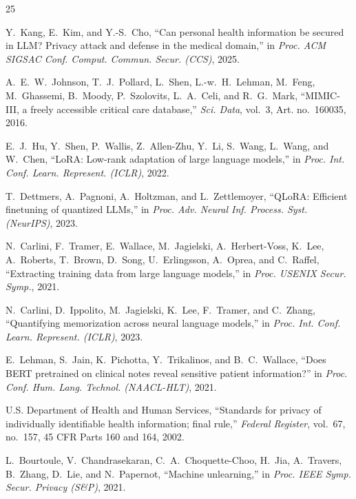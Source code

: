 \documentclass[lettersize,journal]{IEEEtran}
\begin{document}
\begin{thebibliography}{25}


Y.~Kang, E.~Kim, and Y.-S.~Cho, ``Can personal health information be secured in {LLM}? Privacy attack and defense in the medical domain,'' in \textit{Proc. ACM SIGSAC Conf. Comput. Commun. Secur. (CCS)}, 2025.

A.~E.~W.~Johnson, T.~J.~Pollard, L.~Shen, L.-w.~H.~Lehman, M.~Feng, M.~Ghassemi, B.~Moody, P.~Szolovits, L.~A.~Celi, and R.~G.~Mark, ``{MIMIC-III}, a freely accessible critical care database,'' \textit{Sci. Data}, vol.~3, Art. no.~160035, 2016.

E.~J.~Hu, Y.~Shen, P.~Wallis, Z.~Allen-Zhu, Y.~Li, S.~Wang, L.~Wang, and W.~Chen, ``{LoRA}: Low-rank adaptation of large language models,'' in \textit{Proc. Int. Conf. Learn. Represent. (ICLR)}, 2022.

T.~Dettmers, A.~Pagnoni, A.~Holtzman, and L.~Zettlemoyer, ``{QLoRA}: Efficient finetuning of quantized {LLMs},'' in \textit{Proc. Adv. Neural Inf. Process. Syst. (NeurIPS)}, 2023.

N.~Carlini, F.~Tramer, E.~Wallace, M.~Jagielski, A.~Herbert-Voss, K.~Lee, A.~Roberts, T.~Brown, D.~Song, U.~Erlingsson, A.~Oprea, and C.~Raffel, ``Extracting training data from large language models,'' in \textit{Proc. USENIX Secur. Symp.}, 2021.

N.~Carlini, D.~Ippolito, M.~Jagielski, K.~Lee, F.~Tramer, and C.~Zhang, ``Quantifying memorization across neural language models,'' in \textit{Proc. Int. Conf. Learn. Represent. (ICLR)}, 2023.

E.~Lehman, S.~Jain, K.~Pichotta, Y.~Trikalinos, and B.~C.~Wallace, ``Does {BERT} pretrained on clinical notes reveal sensitive patient information?'' in \textit{Proc. Conf. Hum. Lang. Technol. (NAACL-HLT)}, 2021.

U.S. Department of Health and Human Services, ``Standards for privacy of individually identifiable health information; final rule,'' \textit{Federal Register}, vol.~67, no.~157, 45 CFR Parts 160 and 164, 2002.

L.~Bourtoule, V.~Chandrasekaran, C.~A.~Choquette-Choo, H.~Jia, A.~Travers, B.~Zhang, D.~Lie, and N.~Papernot, ``Machine unlearning,'' in \textit{Proc. IEEE Symp. Secur. Privacy (S\&P)}, 2021.


\end{thebibliography}
\end{document}
